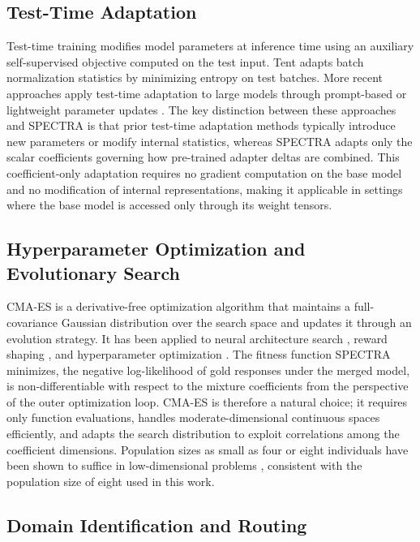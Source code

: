 \documentclass[preprint,12pt]{elsarticle}
\begin{document}
\subsection{Test-Time Adaptation}

Test-time training \cite{sun2019testtime} modifies model parameters at
inference time using an auxiliary self-supervised objective computed on the
test input. Tent \cite{wang2021tent} adapts batch normalization statistics
by minimizing entropy on test batches. More recent approaches apply
test-time adaptation to large models through prompt-based or lightweight
parameter updates \cite{zhao2023testtime, chen2024data}. The key distinction
between these approaches and SPECTRA is that prior test-time adaptation methods
typically introduce new parameters or modify internal statistics, whereas
SPECTRA adapts only the scalar coefficients governing how pre-trained adapter
deltas are combined. This coefficient-only adaptation requires no gradient
computation on the base model and no modification of internal representations,
making it applicable in settings where the base model is accessed only through
its weight tensors.

\subsection{Hyperparameter Optimization and Evolutionary Search}

CMA-ES \cite{hansen2001cma, hansen2016cmaes} is a derivative-free
optimization algorithm that maintains a full-covariance Gaussian distribution
over the search space and updates it through an evolution strategy. It has been
applied to neural architecture search \cite{real2019regularized}, reward
shaping \cite{mania2018simple}, and hyperparameter optimization
\cite{loshchilov2016cmaes}.
The fitness function SPECTRA minimizes, the negative log-likelihood of gold
responses under the merged model, is non-differentiable with respect to the
mixture coefficients from the perspective of the outer optimization loop.
CMA-ES is therefore a natural choice; it requires only function evaluations,
handles moderate-dimensional continuous spaces efficiently, and adapts the
search distribution to exploit correlations among the coefficient dimensions.
Population sizes as small as four or eight individuals have been shown to
suffice in low-dimensional problems \cite{hansen2001cma}, consistent with the
population size of eight used in this work.

\subsection{Domain Identification and Routing}
\end{document}
